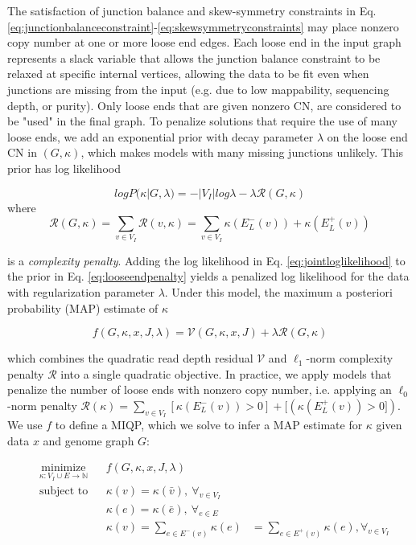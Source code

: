 \documentclass[phd,tocprelim]{cornell}
\begin{document}
The satisfaction of junction balance and skew-symmetry constraints in Eq. \ref{eq:junctionbalanceconstraint}-\ref{eq:skewsymmetryconstraints} may place nonzero copy number at one or more loose end edges.   Each loose end in the input graph represents a slack variable that allows the junction balance constraint to be relaxed at specific internal vertices, allowing the data to be fit even when junctions are missing from the input (e.g. due to low mappability, sequencing depth, or purity).  Only loose ends that are given nonzero CN, are considered to be "used" in the final graph. To penalize solutions that require the use of many loose ends, we add an exponential prior with decay parameter $\lambda$ on the loose end CN in $(G, \kappa)$, which makes models with many missing junctions unlikely.  This prior has log likelihood

\begin{equation} \label{eq:looseendpenalty}
 log P(\kappa | G, \lambda) = -|V_I|log\lambda - \lambda \mathcal{R}(G, \kappa)
\end{equation}  
where
\begin{equation} \label{eq:complexitypenalty}
\mathcal{R}(G, \kappa) = \sum_{v \in V_I} \mathcal{R}(v, \kappa) = \sum_{v \in V_I} \kappa(E_L^-(v))  + \kappa(E_L^+(v))
\end{equation} 

is a \textit{complexity penalty}. Adding the log likelihood in  Eq. \ref{eq:jointloglikelihood} to the prior in Eq. \ref{eq:looseendpenalty} yields a penalized log likelihood for the data with regularization parameter $\lambda$. Under this model, the maximum a posteriori probability (MAP) estimate of $\kappa$ 

\begin{equation} \label{eq:objectivefunction}
 f(G, \kappa, x, J, \lambda) = \mathcal{V}(G,\kappa, x, J) + \lambda \mathcal{R}(G, \kappa)
\end{equation}  

which combines the quadratic read depth residual $\mathcal{V}$ and $\ell_1$-norm  complexity penalty $\mathcal{R}$ into a single quadratic objective.   In practice, we apply models that penalize the number of loose ends with nonzero copy number, i.e. applying an $\ell_0$-norm penalty  $\mathcal{R}(\kappa) = \sum_{v \in V_I} [\kappa(E_L^-(v))>0]  + [(\kappa(E_L^+(v))>0])$.  We use $f$ to define a MIQP, which we solve to infer a MAP estimate for $\kappa$ given data $x$ and genome graph $G$:

\begin{equation} \label{eq:MIQP}
\begin{aligned}
& \underset{\kappa: V_I \cup E \rightarrow \mathbb{N}}{\text{minimize}}
& & f(G, \kappa, x, J, \lambda)  \\
& \text{subject to}
& & \kappa(v) = \kappa(\bar{v}),\ \forall_{v \in V_I} \\
& & & \kappa(e) = \kappa(\bar{e}),\ \forall_{e \in E} \\ 
& & & \kappa(v)= \sum_{e\in E^-(v)} \kappa(e) &= \sum_{e\in E^+(v)} \kappa(e), \forall_{v \in V_I}\\
\end{aligned}
\end{equation}
\end{document}
